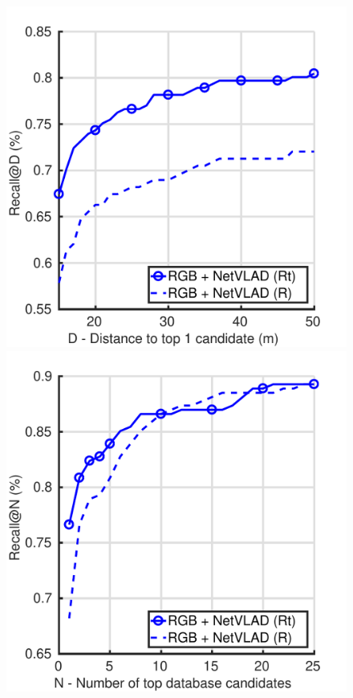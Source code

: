 \begin{figure}
	\centering
	
	\begin{minipage}{0.4\linewidth}
		\includegraphics[width=\linewidth]{details/rgb_r_trunc_distance}	
	\end{minipage}
	\begin{minipage}{0.4\linewidth}
		\includegraphics[width=\linewidth]{details/rgb_r_trunc_recall}	
	\end{minipage}
	

\end{figure}
